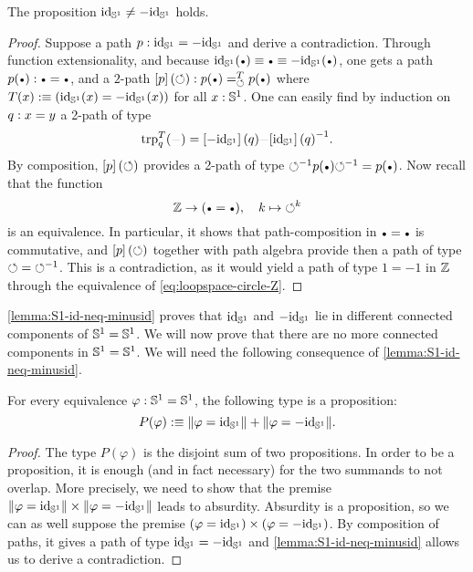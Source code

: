\documentclass[english,a4]{article}
\renewcommand{\ap}[1]{\left[{#1}\right]}
\begin{document}
\begin{lemma}
  \label{lemma:S1-id-neq-minusid}%
  The proposition $\mathord{\mathrm{id}}_{{\mathbb S^{1}}} \neq -\mathord{\mathrm{id}}_{{\mathbb S^{1}}}$ holds.
\end{lemma}
\begin{proof}
  Suppose a path $p:\mathord{\mathrm{id}}_{{\mathbb S^{1}}} = -\mathord{\mathrm{id}}_{{\mathbb S^{1}}}$ and derive a
  contradiction. Through function extensionality, and because
  $\id_\Sc(\base) \jdeq \base \jdeq -\id_\Sc(\base)$, one gets a path
  $p(\base) \from \base = \base$, and a $2$-path
  $\ap p (\Sloop) \from \pathover {p(\base)} T \Sloop {p(\base)}$ where
  $T(x)\mathrel{\hbox{:}\mkern-5mu\equiv} (\mathord{\mathrm{id}}_{{\mathbb S^{1}}}(x) = -\mathord{\mathrm{id}}_{{\mathbb S^{1}}}(x))$ for all $x:{{\mathbb S^{1}}}$. One can
  easily find by induction on $q: x=y$ a 2-path of type
  \begin{displaymath}
    \trp [T] q (\blank) = \ap{-\id_\Sc}(q) \blank \inv{\ap{\id_\Sc}(q)}.
  \end{displaymath}
  By composition, $\ap p (\Sloop)$ provides a 2-path of type
  $\inv\Sloop p(\base) \inv\Sloop = p(\base)$. Now recall that
  the function
  \begin{equation}
    \label{eq:loopspace-circle-Z}%
    \ZZ\to(\base=\base),\quad k \mapsto \Sloop^k 
  \end{equation}
  is an equivalence. In particular, it shows that path-composition in
  $\base=\base$ is commutative, and $\ap p (\Sloop)$ together with
  path algebra provide then a path of type $\mathord{\circlearrowleft} = {\mathord{\circlearrowleft}}^{-1}$. This
  is a contradiction, as it would yield a path of type $1=-1$ in $\mathbb{Z}$
  through the equivalence of \cref{eq:loopspace-circle-Z}.
\end{proof}
\cref{lemma:S1-id-neq-minusid} proves that $\mathord{\mathrm{id}}_{{\mathbb S^{1}}}$ and $-\mathord{\mathrm{id}}_{{\mathbb S^{1}}}$
lie in different connected components of ${{\mathbb S^{1}}}={{\mathbb S^{1}}}$. We will now prove
that there are no more connected components in ${{\mathbb S^{1}}}={{\mathbb S^{1}}}$. We will need
the following consequence of \cref{lemma:S1-id-neq-minusid}.
\begin{corollary}%
  \label{cor:S1-eq-either-isaprop}%
  For every equivalence $\varphi: {{\mathbb S^{1}}}={{\mathbb S^{1}}}$, the following type is
  a proposition:
  \begin{equation}
    \label{eq:S1-def-target-eq}%
    P(\varphi) \defequi \Trunc{\varphi = \id_\Sc} + \Trunc{\varphi = -\id_\Sc}.
  \end{equation}
\end{corollary}
\begin{proof}
  The type $P(\varphi)$ is the disjoint sum of two propositions. In
  order to be a proposition, it is enough (and in fact necessary) for
  the two summands to not overlap. More precisely, we need to show
  that the premise
  $\lVert\varphi = \mathord{\mathrm{id}}_{{\mathbb S^{1}}}\rVert\times\lVert\varphi = -\mathord{\mathrm{id}}_{{\mathbb S^{1}}}\rVert$ leads to
  absurdity. Absurdity is a proposition, so we can as well suppose the
  premise ${(\varphi = \mathord{\mathrm{id}}_{{\mathbb S^{1}}})}\times{(\varphi = -\mathord{\mathrm{id}}_{{\mathbb S^{1}}})}$. By
  composition of paths, it gives a path of type $\mathord{\mathrm{id}}_{{\mathbb S^{1}}} = -\mathord{\mathrm{id}}_{{\mathbb S^{1}}}$
  and \cref{lemma:S1-id-neq-minusid} allows us to derive a
  contradiction.
\end{proof}
\end{document}
